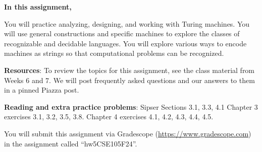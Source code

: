 {\bf In this assignment,}

You will  practice analyzing, designing, and working with Turing machines.
You will use general constructions and specific machines to explore the classes 
of recognizable and decidable languages. 
You will explore various ways to encode machines as strings so that 
computational problems can be recognized.

{\bf Resources}: To review the topics 
for this assignment, see the class material from Weeks 6 and 7.
We will post frequently asked questions and our answers to them in a 
pinned Piazza post. 

{\bf Reading and extra practice problems}:  
Sipser Sections 3.1, 3.3, 4.1
Chapter 3 exercises 3.1, 3.2, 3.5, 3.8.
Chapter 4 exercises 4.1, 4.2, 4.3, 4.4, 4.5.

\instructions

You will submit this assignment via Gradescope
(\href{https://www.gradescope.com}{https://www.gradescope.com}) 
in the assignment called ``hw5CSE105F24''.

